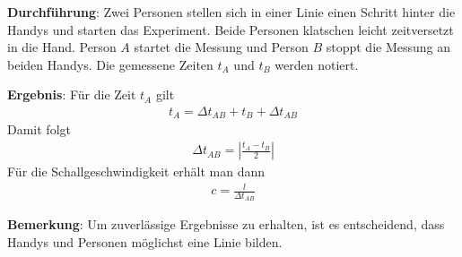 \documentclass[../main.tex]{subfiles}
\begin{document}
\begin{tcolorbox}
    \vspace{0.5cm}
    \textbf{Durchführung}: Zwei Personen stellen sich in einer Linie einen Schritt hinter die Handys und starten das Experiment. Beide Personen klatschen leicht zeitversetzt in die Hand. Person $A$ startet die Messung und Person $B$ stoppt die Messung an beiden Handys. Die gemessene Zeiten $t_A$ und $t_B$ werden notiert.

    \vspace{0.5cm}
    \textbf{Ergebnis}: Für die Zeit $t_A$ gilt
    \begin{align*}
        t_A = \Delta t_{AB} + t_B + \Delta t_{AB}
    \end{align*}
    Damit folgt
    \begin{align*}
        \Delta t_{AB} = \left | \frac{t_A-t_B}{2} \right | 
    \end{align*}
    Für die Schallgeschwindigkeit erhält man dann
    \begin{align*}
        c = \frac{l}{\Delta t_{AB}}
    \end{align*}

    \vspace{0.5cm}
    \textbf{Bemerkung}: Um zuverlässige Ergebnisse zu erhalten, ist es entscheidend, dass Handys und Personen möglichst eine Linie bilden.
\end{tcolorbox}
\end{document}
